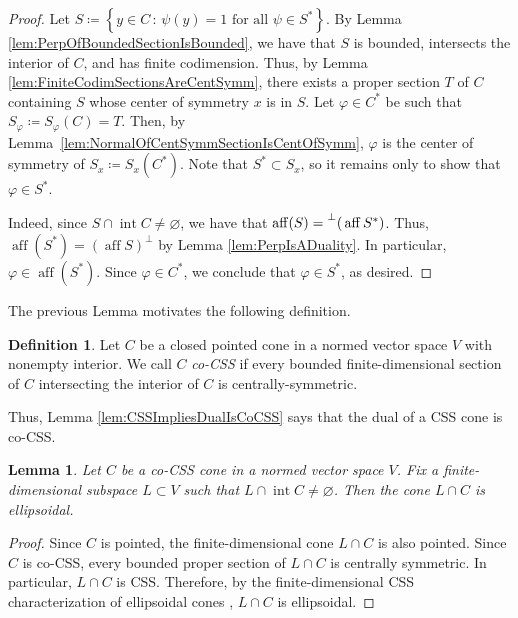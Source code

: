 \documentclass[10pt]{amsart}
\newtheorem{lemma}[thm]{Lemma}
\theoremstyle{definition}
\newtheorem{definition}[thm]{Definition}
\theoremstyle{remark}
\begin{document}
\begin{proof}
   Let $S {\mathrel{\coloneqq}} {\left\lbrace {y \in C {\,:\,} \text{$\psi(y) = 1$ for all
   $\psi \in S^{\ast}$}} \right\rbrace}$.  By Lemma
   \ref{lem:PerpOfBoundedSectionIsBounded}, we have that $S$ is
   bounded, intersects the interior of $C$, and has finite
   codimension.  Thus, by Lemma
   \ref{lem:FiniteCodimSectionsAreCentSymm}, there exists a proper
   section $T$ of $C$ containing $S$ whose center of symmetry $x$
   is in $S$.  Let ${\varphi} \in C^{*}$ be such that $S_{\varphi}
   {\mathrel{\coloneqq}} S_{\varphi}(C) = T$.  Then, by
   Lemma~\ref{lem:NormalOfCentSymmSectionIsCentOfSymm}, ${\varphi}$ is
   the center of symmetry of $S_{x} {\mathrel{\coloneqq}} S_{x}({C^{\ast}})$.
   Note that $S^{\ast} \subset S_{x}$, so it remains only to show
   that ${\varphi} \in S^{\ast}$.
   
   Indeed, since $S \cap {\operatorname{int}} C \ne {\varnothing}$, we have that
   $\operatorname{aff}(S) = {\prescript{\perp}{}{(}}\operatorname{aff} {S^{\ast}})$.  Thus, $\operatorname{aff}({S^{\ast}}) =
   (\operatorname{aff} S)^{\perp}$ by Lemma \ref{lem:PerpIsADuality}.  In
   particular, ${\varphi} \in \operatorname{aff}(S^{\ast})$.  Since ${\varphi} \in {C^{\ast}}$, we conclude that ${\varphi} \in S^{\ast}$, as desired.
\end{proof}

The previous Lemma motivates the following definition.

\begin{definition}
   Let $C$ be a closed pointed cone in a normed vector space $V$
   with nonempty interior.  We call $C$ \emph{co-CSS} if every
   bounded finite-dimensional section of $C$ intersecting the
   interior of $C$ is centrally-symmetric.
\end{definition}

Thus, Lemma \ref{lem:CSSImpliesDualIsCoCSS} says that the dual of 
a CSS cone is co-CSS.

\begin{lemma}
   \label{lem:FiniteDimSubConesOfCoCSSAreEllipsoidal}
   Let $C$ be a co-CSS cone in a normed vector space $V$.  Fix a
   finite-dimensional subspace $L \subset V$ such that $L \cap
   {\operatorname{int}} C \ne {\varnothing}$.  Then the cone $L \cap C$ is
   ellipsoidal.
\end{lemma}

\begin{proof}
   Since $C$ is pointed, the finite-dimensional cone $L \cap C$ is
   also pointed.  Since $C$ is co-CSS, every bounded proper
   section of $L \cap C$ is centrally symmetric.  In particular,
   $L \cap C$ is CSS. Therefore, by the finite-dimensional CSS
   characterization of ellipsoidal cones \cite[Theorem
   1.4]{JerMcA2013}, $L \cap C$ is ellipsoidal.
\end{proof}
\end{document}
